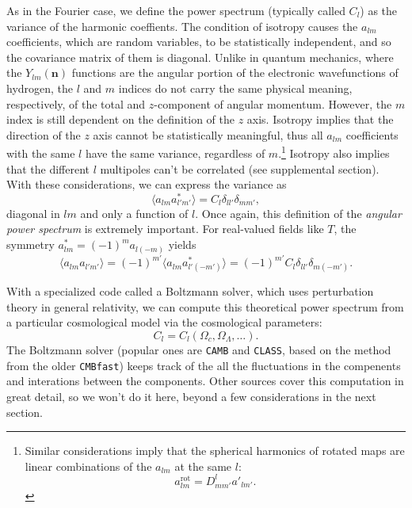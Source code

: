 As in the Fourier case, we define the power spectrum (typically called $C_l$) as the variance of the harmonic coeffients.  The condition of isotropy causes the $a_{lm}$ coefficients, which are random variables, to be statistically independent, and so the covariance matrix of them is diagonal.  Unlike in quantum mechanics, where the $Y_{lm}(\mathbf{n})$ functions are the angular portion of the electronic wavefunctions of hydrogen, the $l$ and $m$ indices do not carry the same physical meaning, respectively, of the total and $z$-component of angular momentum.  However, the $m$ index is still dependent on the definition of the $z$ axis.  Isotropy implies that the direction of the $z$ axis cannot be statistically meaningful, thus all $a_{lm}$ coefficients with the same $l$ have the same variance, regardless of $m$.\footnote{Similar considerations imply that the spherical harmonics of rotated maps are linear combinations of the $a_{lm}$ at the same $l$: \begin{equation}a^\textrm{rot}_{lm} = D^l_{mm'}a'_{lm'}. \end{equation}}  Isotropy also implies that the different $l$ multipoles can't be correlated (see supplemental section).   With these considerations, we can express the variance as
\begin{equation}
  \langle a_{lm} a_{l'm'}^* \rangle = C_l \delta_{ll'} \delta_{mm'},
\end{equation}
diagonal in ${lm}$ and only a function of $l$.  Once again, this definition of the \textit{angular power spectrum} is extremely important.  For real-valued fields like $T$, the symmetry $a_{lm}^* = (-1)^m a_{l(-m)}$ yields 
\begin{equation}
  \langle a_{lm} a_{l'm'} \rangle =  (-1)^{m'} \langle a_{lm} a^*_{l'(-m')} \rangle = (-1)^{m'} C_l \delta_{ll'} \delta_{m(-m')}.
\end{equation}


With a specialized code called a Boltzmann solver, which uses perturbation theory in general relativity, we can compute this theoretical power spectrum from a particular cosmological model via the cosmological parameters:
\begin{equation}
  C_l = C_l(\Omega_c,\Omega_\Lambda,\dots).
\end{equation}
The Boltzmann solver (popular ones are \texttt{CAMB} and \texttt{CLASS}, based on the method from the older \texttt{CMBfast}) keeps track of the all the fluctuations in the compenents and interations between the components.  Other sources cover this computation in great detail, so we won't do it here, beyond a few considerations in the next section.

